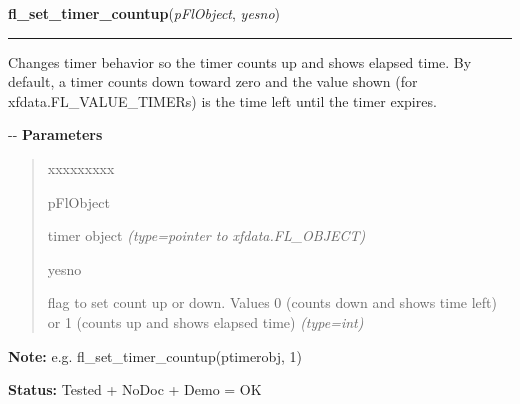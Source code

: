 \hspace{.8\funcindent}\begin{boxedminipage}{\funcwidth}

    \raggedright \textbf{fl\_set\_timer\_countup}(\textit{pFlObject}, \textit{yesno})

    \vspace{-1.5ex}

    \rule{\textwidth}{0.5\fboxrule}
\setlength{\parskip}{2ex}

Changes timer behavior so the timer counts up and shows elapsed time.
By default, a timer counts down toward zero and the value shown (for
xfdata.FL\_VALUE\_TIMERs) is the time left until the timer expires.

-{}-
\setlength{\parskip}{1ex}
      \textbf{Parameters}
      \vspace{-1ex}

      \begin{quote}
        \begin{Ventry}{xxxxxxxxx}

          \item[pFlObject]


timer object
            {\it (type=pointer to xfdata.FL\_OBJECT)}

          \item[yesno]


flag to set count up or down. Values 0 (counts down and shows time
left) or 1 (counts up and shows elapsed time)
            {\it (type=int)}

        \end{Ventry}

      \end{quote}

\textbf{Note:} 
e.g. fl\_set\_timer\_countup(ptimerobj, 1)


\textbf{Status:} 
Tested + NoDoc + Demo = OK


    \end{boxedminipage}

    \label{xformslib:fltimer:fl_set_timer_filter}

    \vspace{0.5ex}

